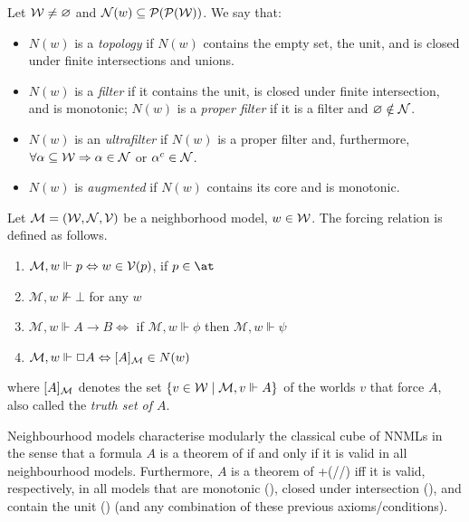\documentclass{llncs}
\begin{document}
\begin{definition} Let $\mathcal W \neq \varnothing$ and $\mathcal N(w) \subseteq \mathcal{P}(\mathcal{P}(\mathcal W))$. We say that: 
\begin{itemize}
    \item $N(w)$ is a {\em topology} if $N(w)$ contains the empty set, the unit, and is closed under finite intersections and unions. 
    \item $N(w)$ is a {\em filter} if it contains the unit, is closed under finite intersection, and is monotonic; $N(w)$ is a {\em proper filter} if it is a filter and $\varnothing \notin \mathcal N$. 
    \item $N(w)$ is an {\em ultrafilter} if $N(w)$ is a proper filter and, furthermore, $\forall \alpha \subseteq \mathcal W \Rightarrow \alpha \in \mathcal N$ or $\alpha^{c} \in \mathcal N$. 
    \item $N(w)$ is {\em augmented} if $N(w)$ contains its core and is monotonic.
\end{itemize}
\end{definition}

\begin{definition}  Let $\mathcal{M} = (\mathcal W, \mathcal N, \mathcal V)$ be a neighborhood model, $w \in \mathcal W$. The forcing relation is defined as follows.
\begin{enumerate}
    \item $\mathcal{M}, w \Vdash p \Leftrightarrow w \in \mathcal V(p)$, if $p \in \at$
    \item $\mathcal{M}, w \not\Vdash \bot$ for any $w$ 
    \item $\mathcal{M}, w \Vdash A \rightarrow B \Leftrightarrow$ if $\mathcal{M}, w \Vdash \phi$ then $\mathcal{M}, w \Vdash \psi$ 
    \item $\mathcal{M}, w \Vdash \Box A \Leftrightarrow [A]_{\mathcal M} \in N(w)$
\end{enumerate}
where $[A]_{\mathcal M}$ denotes the set $\{v \in \mathcal W \mid \mathcal M, v \Vdash A\}$ of the worlds $v$
that force $A$, also called the {\em truth set of $A$}. 
\end{definition} 
 
Neighbourhood models characterise modularly the classical cube of NNMLs \cite{Chellas:1980fk} in the sense that a formula $A$ is a theorem of  \E{} if and only if it is valid in all neighbourhood models.  
Furthermore, 
$A$ is a theorem of 
\E{}+(\axM /\axC /\axN) iff it is valid, respectively, in all  models that are monotonic (\axM),  closed under intersection (\axC), and contain the unit (\axN) (and any combination of these previous axioms/conditions). 
\end{document}
